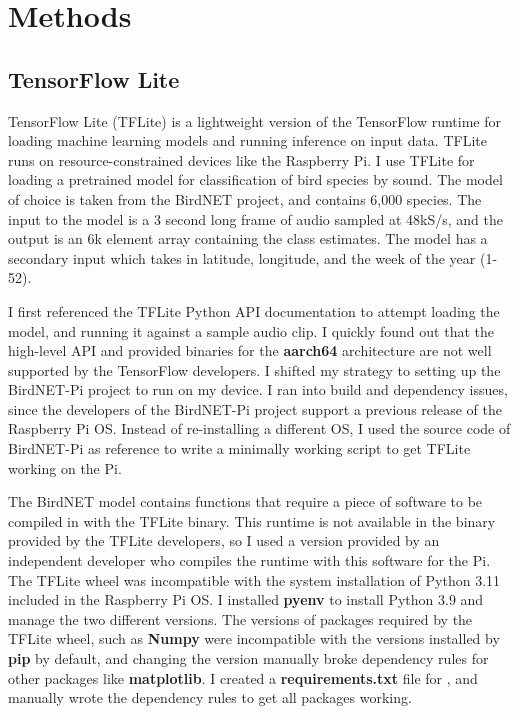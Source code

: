\documentclass[12pt]{article}
\begin{document}
\section{Methods}\label{sec:methods}
\subsection{TensorFlow Lite}
	
	TensorFlow Lite (TFLite) is a lightweight version of the TensorFlow runtime for loading machine learning models and running inference on input data. TFLite runs on resource-constrained devices like the Raspberry Pi. I use TFLite for loading a pretrained model for classification of bird species by sound. The model of choice is taken from the BirdNET project, and contains 6,000 species. The input to the model is a 3 second long frame of audio sampled at 48kS/s, and the output is an 6k element array containing the class estimates. The model has a secondary input which takes in latitude, longitude, and the week of the year (1-52).
	
	I first referenced the TFLite Python API documentation to attempt loading the model, and running it against a sample audio clip. I quickly found out that the high-level API and provided binaries for the \textbf{aarch64} architecture are not well supported by the TensorFlow developers. I shifted my strategy to setting up the BirdNET-Pi project to run on my device. I ran into build and dependency issues, since the developers of the BirdNET-Pi project support a previous release of the Raspberry Pi OS. Instead of re-installing a different OS, I used the source code of BirdNET-Pi as reference to write a minimally working script to get TFLite working on the Pi.
	
	The BirdNET model contains functions that require a piece of software to be compiled in with the TFLite binary. This runtime is not available in the binary provided by the TFLite developers, so I used a version provided by an independent developer who compiles the runtime with this software for the Pi. The TFLite wheel was incompatible with the system installation of Python 3.11 included in the Raspberry Pi OS. I installed \textbf{pyenv} to install Python 3.9 and manage the two different versions. The versions of packages required by the TFLite wheel, such as \textbf{Numpy} were incompatible with the versions installed by \textbf{pip} by default, and changing the version manually broke dependency rules for other packages like \textbf{matplotlib}. I created a \textbf{requirements.txt} file for , and manually wrote the dependency rules  to get all packages working.
	
\end{document}
